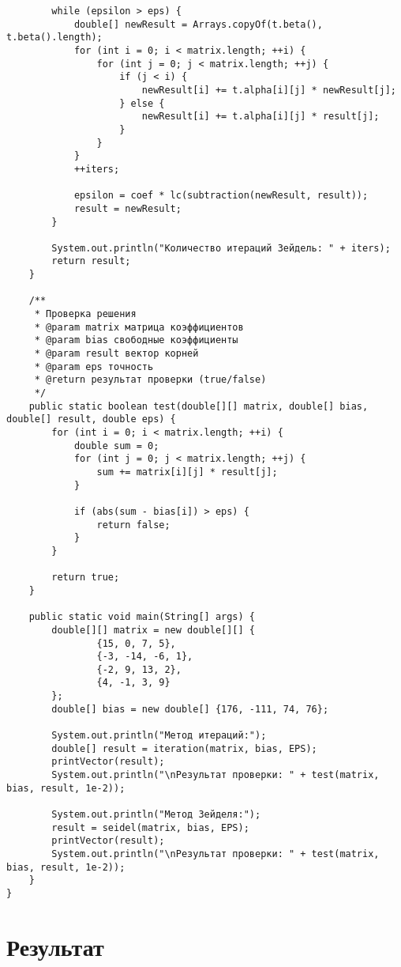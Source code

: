 \begin{verbatim}
        while (epsilon > eps) {
            double[] newResult = Arrays.copyOf(t.beta(), t.beta().length);
            for (int i = 0; i < matrix.length; ++i) {
                for (int j = 0; j < matrix.length; ++j) {
                    if (j < i) {
                        newResult[i] += t.alpha[i][j] * newResult[j];
                    } else {
                        newResult[i] += t.alpha[i][j] * result[j];
                    }
                }
            }
            ++iters;

            epsilon = coef * lc(subtraction(newResult, result));
            result = newResult;
        }

        System.out.println("Количество итераций Зейдель: " + iters);
        return result;
    }

    /**
     * Проверка решения
     * @param matrix матрица коэффициентов
     * @param bias свободные коэффициенты
     * @param result вектор корней
     * @param eps точность
     * @return результат проверки (true/false)
     */
    public static boolean test(double[][] matrix, double[] bias, double[] result, double eps) {
        for (int i = 0; i < matrix.length; ++i) {
            double sum = 0;
            for (int j = 0; j < matrix.length; ++j) {
                sum += matrix[i][j] * result[j];
            }

            if (abs(sum - bias[i]) > eps) {
                return false;
            }
        }

        return true;
    }

    public static void main(String[] args) {
        double[][] matrix = new double[][] {
                {15, 0, 7, 5},
                {-3, -14, -6, 1},
                {-2, 9, 13, 2},
                {4, -1, 3, 9}
        };
        double[] bias = new double[] {176, -111, 74, 76};

        System.out.println("Метод итераций:");
        double[] result = iteration(matrix, bias, EPS);
        printVector(result);
        System.out.println("\nРезультат проверки: " + test(matrix, bias, result, 1e-2));

        System.out.println("Метод Зейделя:");
        result = seidel(matrix, bias, EPS);
        printVector(result);
        System.out.println("\nРезультат проверки: " + test(matrix, bias, result, 1e-2));
    }
}
\end{verbatim}

\section*{Результат}

